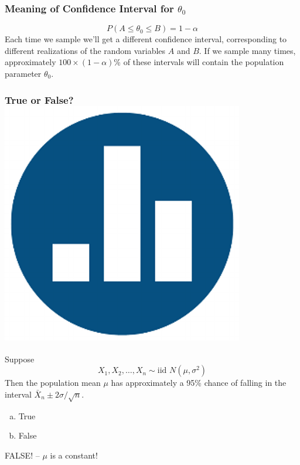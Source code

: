 \documentclass[handout]{beamer}
\begin{document}
\begin{frame}
\frametitle{Meaning of Confidence Interval for $\theta_0$}
	$$\boxed{P(A\leq \theta_0 \leq B) = 1-\alpha}$$
Each time we sample we'll get a different confidence interval, corresponding to different realizations of the random variables $A$ and $B$. If we sample many times, approximately $100\times(1-\alpha)$\% of these intervals will contain the population parameter $\theta_0$.

\end{frame}





\begin{frame}
\frametitle{True or False? \hfill \includegraphics[scale = 0.05]{./images/clicker}}
Suppose 
	$$\boxed{X_1, X_2, \hdots, X_n\sim \mbox{iid } N(\mu,\sigma^2)}$$
Then the population mean $\mu$ has approximately a 95\% chance of falling in the interval $\bar{X}_n \pm 2 \sigma/\sqrt{n}$.

\vspace{1em}

\begin{enumerate}[(a)]
\item True
\item False
\end{enumerate}


\pause
\vspace{1em}
\alert{\huge FALSE! -- $\mu$  is a constant!}


\end{frame}
\end{document}

